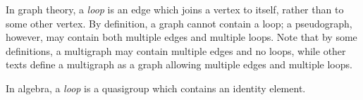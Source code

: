 \documentclass[12pt]{article}
\begin{document}
In graph theory, a \emph{loop} is an edge which joins a vertex
to itself, rather than to some other vertex. By definition,
a graph cannot contain a loop; a pseudograph, however, may contain
both multiple edges and multiple loops. Note that by some definitions,
a multigraph may contain multiple edges and no loops, while other texts
define a multigraph as a graph
allowing multiple edges and multiple loops.

In algebra, a \emph{loop} is a quasigroup which contains an identity element.
\end{document}
